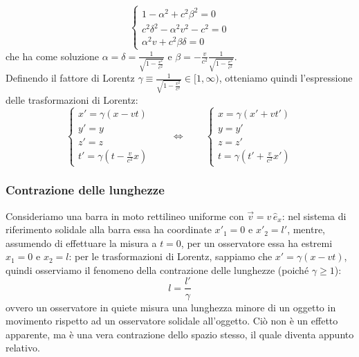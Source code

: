 \documentclass[]{article}
\begin{document}
\begin{equation}
	\begin{cases}
		1 - \alpha^2 + c^2 \beta^2 = 0 \\ 
		c^2 \delta^2 - \alpha^2 v^2 - c^2 = 0 \\ 
		\alpha^2 v + c^2 \beta\delta = 0
	\end{cases}
	\label{eq:5}
\end{equation}
che ha come soluzione $ \alpha = \delta = \frac{1}{\sqrt{1 - \frac{v^2}{c^2}}} $ e $ \beta = -\frac{v}{c^2}\frac{1}{\sqrt{1 - \frac{v^2}{c^2}}} $. \\ 
%
Definendo il fattore di Lorentz $ \gamma \equiv \frac{1}{\sqrt{1 - \frac{v^2}{c^2}}} \in [1, \infty)$, otteniamo quindi l'espressione delle trasformazioni di Lorentz:
\begin{equation}
	\begin{cases}
		x' = \gamma \left(x - vt\right) \\ 
		y' = y \\ 
		z' = z \\ 
		t' = \gamma \left(t - \frac{v}{c^2} x\right)
	\end{cases}
	\qquad\Longleftrightarrow\qquad
		\begin{cases}
		x = \gamma \left(x' + vt'\right) \\ 
		y = y' \\ 
		z = z' \\ 
		t = \gamma \left(t' + \frac{v}{c^2} x'\right)
	\end{cases}
	\label{eq:6}
\end{equation}

\subsubsection{Contrazione delle lunghezze}

Consideriamo una barra in moto rettilineo uniforme con $ \vec{v} = v\,\hat{e}_x $: nel sistema di riferimento solidale alla barra essa ha coordinate $ x'_1 = 0 $ e $ x'_2 = l' $, mentre, assumendo di effettuare la misura a $ t = 0 $, per un osservatore essa ha estremi $ x_1 = 0 $ e $ x_2 = l $: per le trasformazioni di Lorentz, sappiamo che $ x' = \gamma (x - vt) $, quindi osserviamo il fenomeno della contrazione delle lunghezze (poiché $ \gamma \ge 1 $):
\begin{equation}
	l = \frac{l'}{\gamma}
	\label{eq:7}
\end{equation}
ovvero un osservatore in quiete misura una lunghezza minore di un oggetto in movimento rispetto ad un osservatore solidale all'oggetto. Ciò non è un effetto apparente, ma è una vera contrazione dello spazio stesso, il quale diventa appunto relativo.
\end{document}

